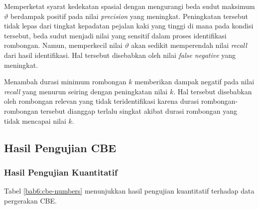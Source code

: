 Memperketat syarat kedekatan spasial dengan mengurangi beda sudut maksimum $\vartheta$ berdampak positif pada nilai \textit{precision} yang meningkat. Peningkatan tersebut tidak lepas dari tingkat kepadatan pejalan kaki yang tinggi di mana pada kondisi tersebut, beda sudut menjadi nilai yang sensitif dalam proses identifikasi rombongan. Namun, memperkecil nilai $\vartheta$ akan sedikit memperendah nilai \textit{recall} dari hasil identifikasi. Hal tersebut disebabkan oleh nilai \textit{false negative} yang meningkat.

Menambah durasi minimum rombongan $k$ memberikan dampak negatif pada nilai \textit{recall} yang menurun seiring dengan peningkatan nilai $k$. Hal tersebut disebabkan oleh rombongan relevan yang tidak teridentifikasi karena durasi rombongan-rombongan tersebut dianggap terlalu singkat akibat durasi rombongan yang tidak mencapai nilai $k$.  

\subsection{Hasil Pengujian CBE}
\label{subsec:cbe-result}

\subsubsection{Hasil Pengujian Kuantitatif}
\label{subsubsec:cbe-quantitative}

Tabel \ref{bab6:cbe-numbers} menunjukkan hasil pengujian kuantitatif terhadap data pergerakan CBE.

